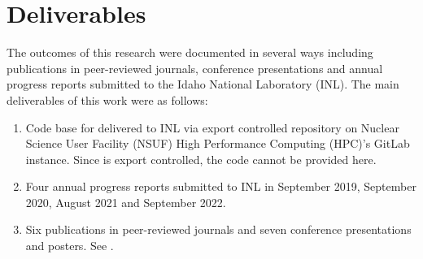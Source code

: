 \section{Deliverables}
	The outcomes of this research were documented in several ways including publications in peer-reviewed journals, conference presentations and annual progress reports submitted to the Idaho National Laboratory (INL). The main deliverables of this work were as follows:
	\begin{enumerate}
	\item Code base for {\GEM} delivered to INL via export controlled repository on Nuclear Science User Facility (NSUF) High Performance Computing (HPC)'s GitLab instance. Since {\YJ} is export controlled, the code cannot be provided here.
	\item Four annual progress reports submitted to INL in September 2019, September 2020, August 2021 and September 2022. 
	\item Six publications in peer-reviewed journals and seven conference presentations and posters. See .
	\end{enumerate}
	